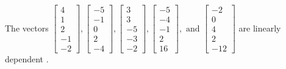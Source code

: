 \begin{exercise}
\begin{exerciseStatement}
  \end{exerciseStatement}
  \begin{exerciseAnswer}
   The vectors \(\left[\begin{array}{r}
4 \\
1 \\
2 \\
-1 \\
-2
\end{array}\right] , \left[\begin{array}{r}
-5 \\
-1 \\
0 \\
2 \\
-4
\end{array}\right] , \left[\begin{array}{r}
3 \\
3 \\
-5 \\
-3 \\
-2
\end{array}\right] , \left[\begin{array}{r}
-5 \\
-4 \\
-1 \\
2 \\
16
\end{array}\right] , \text{ and } \left[\begin{array}{r}
-2 \\
0 \\
4 \\
2 \\
-12
\end{array}\right]\) are 
  	 linearly dependent  .
  


  \end{exerciseAnswer}
\end{exercise}
